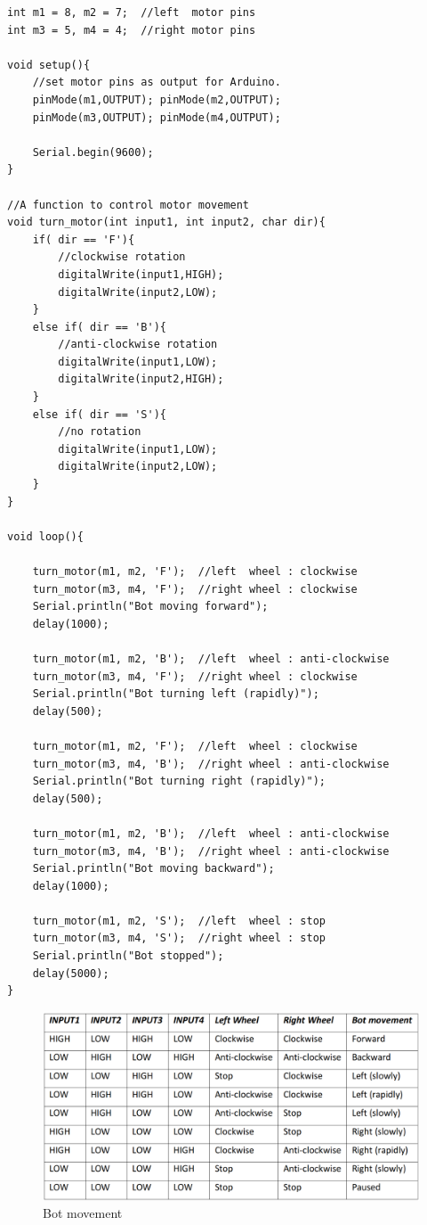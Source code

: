 \begin{lstlisting}[style=CStyle]
int m1 = 8, m2 = 7;  //left  motor pins
int m3 = 5, m4 = 4;  //right motor pins

void setup(){
    //set motor pins as output for Arduino.
    pinMode(m1,OUTPUT); pinMode(m2,OUTPUT);
    pinMode(m3,OUTPUT); pinMode(m4,OUTPUT);
    
    Serial.begin(9600);
}

//A function to control motor movement
void turn_motor(int input1, int input2, char dir){
    if( dir == 'F'){
        //clockwise rotation
        digitalWrite(input1,HIGH);
        digitalWrite(input2,LOW);
    }
    else if( dir == 'B'){
        //anti-clockwise rotation
        digitalWrite(input1,LOW);
        digitalWrite(input2,HIGH);
    }
    else if( dir == 'S'){
        //no rotation
        digitalWrite(input1,LOW);
        digitalWrite(input2,LOW);
    }
}

void loop(){

    turn_motor(m1, m2, 'F');  //left  wheel : clockwise
    turn_motor(m3, m4, 'F');  //right wheel : clockwise
    Serial.println("Bot moving forward");
    delay(1000);
    
    turn_motor(m1, m2, 'B');  //left  wheel : anti-clockwise
    turn_motor(m3, m4, 'F');  //right wheel : clockwise
    Serial.println("Bot turning left (rapidly)");
    delay(500);
    
    turn_motor(m1, m2, 'F');  //left  wheel : clockwise
    turn_motor(m3, m4, 'B');  //right wheel : anti-clockwise
    Serial.println("Bot turning right (rapidly)");
    delay(500);
    
    turn_motor(m1, m2, 'B');  //left  wheel : anti-clockwise
    turn_motor(m3, m4, 'B');  //right wheel : anti-clockwise
    Serial.println("Bot moving backward");
    delay(1000);
    
    turn_motor(m1, m2, 'S');  //left  wheel : stop
    turn_motor(m3, m4, 'S');  //right wheel : stop
    Serial.println("Bot stopped");
    delay(5000);
}
\end{lstlisting}

\begin{figure}
    \centering
    \includegraphics{Tables/Motor_Driver/bot_movement.png}
    \caption{Bot movement}
    \label{fig:move1_table}
\end{figure}

